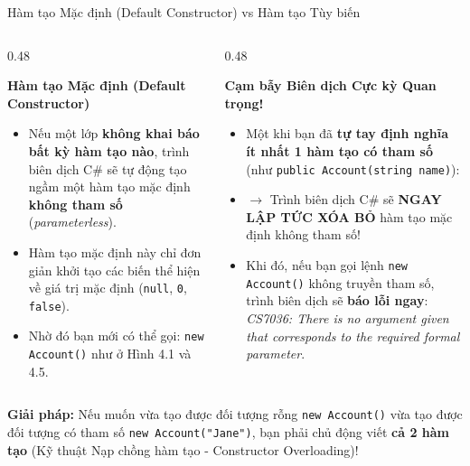 \documentclass[aspectratio=169, 10pt]{beamer}
\begin{document}
\begin{frame}{Hàm tạo Mặc định (Default Constructor) vs Hàm tạo Tùy biến}
  \begin{columns}[T]
    \begin{column}{0.48\textwidth}
      \begin{block}{\textbf{Hàm tạo Mặc định (Default Constructor)}}
        \begin{itemize}\small
          \item Nếu một lớp \textbf{không khai báo bất kỳ hàm tạo nào}, trình biên dịch C\# sẽ tự động tạo ngầm một hàm tạo mặc định \textbf{không tham số} (\textit{parameterless}).
          \item Hàm tạo mặc định này chỉ đơn giản khởi tạo các biến thể hiện về giá trị mặc định (\texttt{null}, \texttt{0}, \texttt{false}).
          \item Nhờ đó bạn mới có thể gọi: \texttt{new Account()} như ở Hình 4.1 và 4.5.
        \end{itemize}
      \end{block}
    \end{column}

    \begin{column}{0.48\textwidth}
      \begin{alertblock}{\textbf{Cạm bẫy Biên dịch Cực kỳ Quan trọng!}}
        \begin{itemize}\small
          \item Một khi bạn đã \textbf{tự tay định nghĩa ít nhất 1 hàm tạo có tham số} (như \texttt{public Account(string name)}):
          \item $\to$ Trình biên dịch C\# sẽ \textbf{NGAY LẬP TỨC XÓA BỎ} hàm tạo mặc định không tham số!
          \item Khi đó, nếu bạn gọi lệnh \texttt{new Account()} không truyền tham số, trình biên dịch sẽ \textbf{báo lỗi ngay}: \textit{CS7036: There is no argument given that corresponds to the required formal parameter}.
        \end{itemize}
      \end{alertblock}
    \end{column}
  \end{columns}
  \vspace{2mm}
  \begin{exampleblock}{\textbf{Giải pháp:}}
    Nếu muốn vừa tạo được đối tượng rỗng \texttt{new Account()} vừa tạo được đối tượng có tham số \texttt{new Account("Jane")}, bạn phải chủ động viết \textbf{cả 2 hàm tạo} (Kỹ thuật Nạp chồng hàm tạo - Constructor Overloading)!
  \end{exampleblock}
\end{frame}
\end{document}
